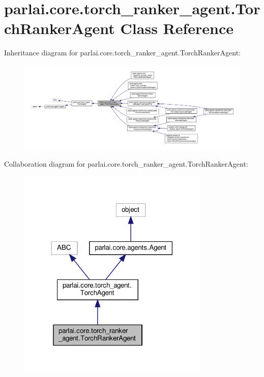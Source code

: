 \hypertarget{classparlai_1_1core_1_1torch__ranker__agent_1_1TorchRankerAgent}{}\section{parlai.\+core.\+torch\+\_\+ranker\+\_\+agent.\+Torch\+Ranker\+Agent Class Reference}
\label{classparlai_1_1core_1_1torch__ranker__agent_1_1TorchRankerAgent}


Inheritance diagram for parlai.\+core.\+torch\+\_\+ranker\+\_\+agent.\+Torch\+Ranker\+Agent\+:\nopagebreak
\begin{figure}[H]
\begin{center}
\leavevmode
\includegraphics[width=350pt]{d3/df3/classparlai_1_1core_1_1torch__ranker__agent_1_1TorchRankerAgent__inherit__graph}
\end{center}
\end{figure}


Collaboration diagram for parlai.\+core.\+torch\+\_\+ranker\+\_\+agent.\+Torch\+Ranker\+Agent\+:
\nopagebreak
\begin{figure}[H]
\begin{center}
\leavevmode
\includegraphics[width=258pt]{dd/d66/classparlai_1_1core_1_1torch__ranker__agent_1_1TorchRankerAgent__coll__graph}
\end{center}
\end{figure}
